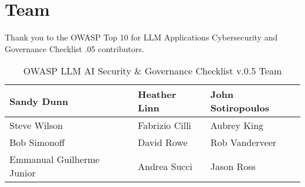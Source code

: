 

\headerimage
\chapter{Team}
Thank you to the OWASP Top 10 for LLM Applications Cybersecurity and Governance
Checklist .05 contributors.

\begin{table}[h]
\begin{tabularx}{\textwidth} {
  | >{\raggedright\arraybackslash}X
  | >{\centering\arraybackslash}X
  | >{\raggedleft\arraybackslash}X | }
 \hline
    Sandy Dunn & Heather Linn & John Sotiropoulos   \\
    \hline
    Steve Wilson & Fabrizio Cilli & Aubrey King     \\
    \hline
    Bob Simonoff & David Rowe & Rob Vanderveer      \\
    \hline
    Emmanual Guilherme Junior & Andrea Succi & Jason Ross \\
    \hline
\end{tabularx}
\caption{OWASP LLM AI Security \& Governance Checklist v.0.5 Team}
\label{tab:team}
\end{table}